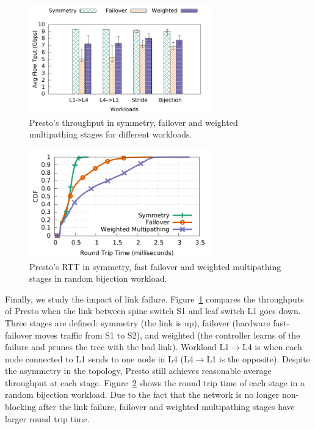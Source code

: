 
\begin{figure}[!t]
        \centering
  \includegraphics[width=0.7\textwidth]{presto/figures/failure_handling/failover_compare_tput_witherrbar.pdf}
        \caption{Presto's throughput in symmetry, failover and weighted multipathing stages for different workloads.}
        \label{failover_compare_tput}
\end{figure}

\begin{figure}[!t]
        \centering
  \includegraphics[width=0.7\textwidth]{presto/figures/failure_handling/failover_compare_sockperf_bijection_mice.pdf}
        \caption{Presto's RTT in symmetry, fast failover and weighted multipathing stages in  random bijection workload.}
        \label{failover_compare_sockperf_bijection}
\end{figure}

Finally, we study the impact of link failure.
Figure~\ref{failover_compare_tput} compares the throughputs of
Presto when %
the link between spine switch S1 and leaf switch L1 goes down.
Three stages are defined: symmetry (the link is up), failover (hardware fast-failover moves traffic from S1 to S2), and weighted (the controller
learns of the failure and prunes the tree with the bad link).
Workload L1$\rightarrow$L4 is when each node connected to L1 sends to one node in L4 (L4$\rightarrow$L1 is the opposite).
Despite the asymmetry in the topology, Presto still achieves reasonable average throughput at 
each stage.
Figure~\ref{failover_compare_sockperf_bijection} shows the round trip time of
each stage in a random bijection workload. 
Due to the fact that the network is no longer non-blocking after the link failure,
failover and weighted multipathing stages have larger round trip time.



